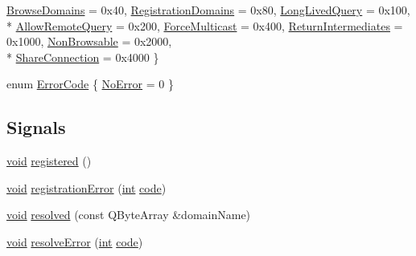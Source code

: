 \begin{DoxyCompactItemize}
\hyperlink{class_qxt_discoverable_service_ab0150c1654466841078bf25055120914ad29bf8ba822c9217fe1e51f8026004e4}{Browse\-Domains} = 0x40, 
\hyperlink{class_qxt_discoverable_service_ab0150c1654466841078bf25055120914a5ae4cce940d10ff1ee1a79104b7ac59f}{Registration\-Domains} = 0x80, 
\hyperlink{class_qxt_discoverable_service_ab0150c1654466841078bf25055120914a7c770ee0345045c29ff7e46ed2788779}{Long\-Lived\-Query} = 0x100, 
\\*
\hyperlink{class_qxt_discoverable_service_ab0150c1654466841078bf25055120914a86e751a340d9dcabf8bf4523839fe80b}{Allow\-Remote\-Query} = 0x200, 
\hyperlink{class_qxt_discoverable_service_ab0150c1654466841078bf25055120914ad5ebcdd67993135cdaa020a762cb2c17}{Force\-Multicast} = 0x400, 
\hyperlink{class_qxt_discoverable_service_ab0150c1654466841078bf25055120914af2bdc08c67becb1a0c9ab9ccaa0be6ed}{Return\-Intermediates} = 0x1000, 
\hyperlink{class_qxt_discoverable_service_ab0150c1654466841078bf25055120914a1e934223f9b41de0a4b0ab4cefb422f4}{Non\-Browsable} = 0x2000, 
\\*
\hyperlink{class_qxt_discoverable_service_ab0150c1654466841078bf25055120914a409070bb326f85405301e705c4ba56e2}{Share\-Connection} = 0x4000
 \}
\item 
enum \hyperlink{class_qxt_discoverable_service_a0ea63c28bb86b71ff278c6617708a2f3}{Error\-Code} \{ \hyperlink{class_qxt_discoverable_service_a0ea63c28bb86b71ff278c6617708a2f3a85f221acd82ad2d426b5034f47a09eb3}{No\-Error} = 0
 \}
\end{DoxyCompactItemize}
\subsection*{Signals}
\begin{DoxyCompactItemize}
\item 
\hyperlink{group___u_a_v_objects_plugin_ga444cf2ff3f0ecbe028adce838d373f5c}{void} \hyperlink{class_qxt_discoverable_service_a8b7e54e670cdbff3f476f704f83ed81b}{registered} ()
\item 
\hyperlink{group___u_a_v_objects_plugin_ga444cf2ff3f0ecbe028adce838d373f5c}{void} \hyperlink{class_qxt_discoverable_service_a9acb9d223fffc775284992b87cf75ae4}{registration\-Error} (\hyperlink{ioapi_8h_a787fa3cf048117ba7123753c1e74fcd6}{int} \hyperlink{structcode}{code})
\item 
\hyperlink{group___u_a_v_objects_plugin_ga444cf2ff3f0ecbe028adce838d373f5c}{void} \hyperlink{class_qxt_discoverable_service_abd5e5e8363f240b653dc446f7735b1c0}{resolved} (const Q\-Byte\-Array \&domain\-Name)
\item 
\hyperlink{group___u_a_v_objects_plugin_ga444cf2ff3f0ecbe028adce838d373f5c}{void} \hyperlink{class_qxt_discoverable_service_ada902db563423a3aa1994f464c17a294}{resolve\-Error} (\hyperlink{ioapi_8h_a787fa3cf048117ba7123753c1e74fcd6}{int} \hyperlink{structcode}{code})
\end{DoxyCompactItemize}
